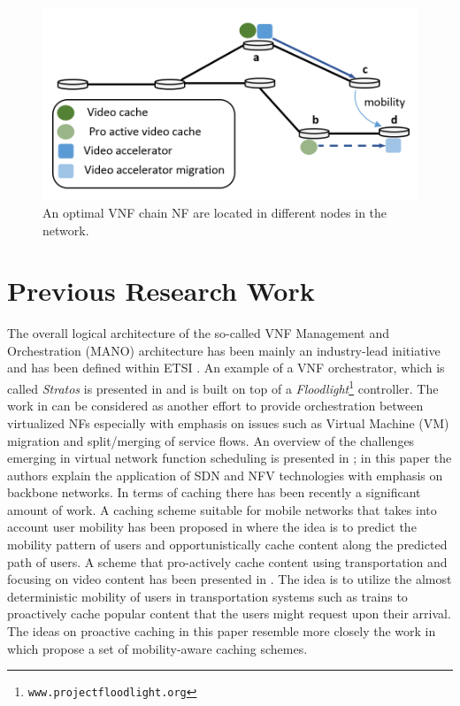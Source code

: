 \documentclass[journal]{IEEEtran}
\begin{document}
\begin{figure}
  \includegraphics[width=0.9\columnwidth]{cache_chain}
  \caption{An optimal VNF chain NF are located in different nodes in the network.}
  \label{fig:opt_cache_chain}
\end{figure}

\section{Previous Research Work}
The overall logical architecture of the so-called VNF Management and Orchestration (MANO) architecture has been mainly an industry-lead initiative and has been defined within ETSI \cite{NFV}. An example of a VNF orchestrator, which is called \emph{Stratos} is presented in\cite{Stratos} and is built on top of a \emph{Floodlight}\footnote{\texttt{www.projectfloodlight.org}} controller. The work in \cite{Split/Merge} can be considered as another effort to provide orchestration between virtualized NFs especially with  emphasis on issues such as Virtual Machine (VM) migration and split/merging of service flows. An overview of the challenges emerging in virtual network function scheduling is presented in \cite{Riera}; in this paper the authors explain the application of SDN and NFV technologies with emphasis on backbone networks.
In terms of caching there has been recently a significant amount of work. A caching scheme suitable for mobile networks that takes into account user mobility has been proposed in  \cite{op_caching} where the idea is to  predict  the mobility pattern of users and opportunistically cache content along the predicted path of users. A scheme that pro-actively cache content using transportation and focusing on video content has been presented in \cite{caching_transportation}. The idea is to utilize the almost deterministic mobility of users in transportation systems such as trains to proactively cache popular content that the users might request upon their arrival. The ideas on proactive caching in this paper
resemble more closely the work in \cite{PCWR, Efficient proactive caching for support seamless mobility} which propose a set of mobility-aware caching schemes.
\end{document}
